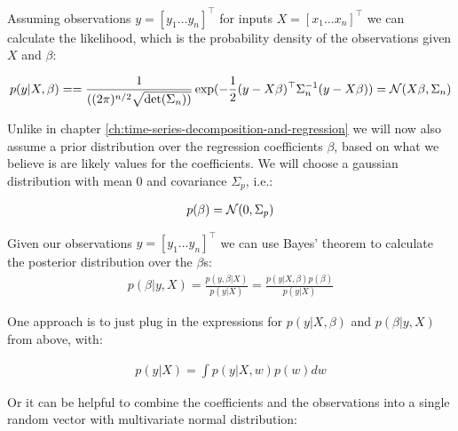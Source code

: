 Assuming observations $y = [y_1 \dots y_n]^{\top}$ for inputs $X = [x_1 \dots x_n]^{\top}$
we can calculate the likelihood,
which is the probability density of the observations given $X$ and $\beta$:

\begin{gather*}
    p(y|X,\beta) =
    = \frac{1}{( (2\pi)^{n/2} \sqrt {\det(\Sigma_n))}}
    \exp(-\frac{1}{2}(y - X\beta)^{\top} \Sigma_n^{-1}(y-X\beta))
    = \operatorname{\mathcal{N}}(X \beta, \Sigma_n)
\end{gather*}

Unlike in chapter \ref{ch:time-series-decomposition-and-regression} we will now also
assume a prior distribution over the regression coefficients $\beta$, based on
what we believe is are likely values for the coefficients. We will choose a gaussian
distribution with mean $0$ and covariance $\Sigma_p$, i.e.:

\begin{gather*}
    p(\beta) = \operatorname{\mathcal{N}}(0, \Sigma_p)
\end{gather*}

Given our observations $y = [y_1 \dots y_n]^{\top}$  we can use Bayes' theorem to calculate the posterior distribution over the $\beta$s:
\begin{gather*}
    p(\beta|y, X) = \frac{p(y,\beta|X)}{p(y|X)} = \frac{p(y|X,\beta)p(\beta)}{p(y|X)}
\end{gather*}

One approach is to just plug in the expressions for $p(y|X,\beta)$ and $p(\beta|y, X)$ from above, with:

\begin{gather*}
    p(y|X) = \int p(y|X,w) p(w) dw
\end{gather*}

Or it can be helpful to combine the coefficients and the observations into a single random vector with
multivariate normal distribution:


